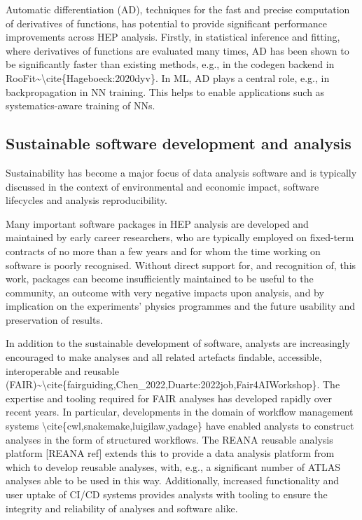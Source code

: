 Automatic differentiation (AD), techniques for the fast and precise
computation of derivatives of functions, has potential to provide
significant performance improvements across HEP analysis. Firstly, in
statistical inference and fitting, where derivatives of functions are
evaluated many times, AD has been shown to be significantly faster than
existing methods, e.g., in the codegen backend in
RooFit\textasciitilde\textbackslash cite\{Hageboeck:2020dyv\}. In ML, AD
plays a central role, e.g., in backpropagation in NN training. This
helps to enable applications such as systematics-aware training of NNs.

\subsection{Sustainable software development and
analysis}\label{sustainable-software-development-and-analysis}

Sustainability has become a major focus of data analysis software and is
typically discussed in the context of environmental and economic impact,
software lifecycles and analysis reproducibility.

Many important software packages in HEP analysis are developed and
maintained by early career researchers, who are typically employed on
fixed-term contracts of no more than a few years and for whom the time
working on software is poorly recognised. Without direct support for,
and recognition of, this work, packages can become insufficiently
maintained to be useful to the community, an outcome with very negative
impacts upon analysis, and by implication on the experiments' physics
programmes and the future usability and preservation of results.

In addition to the sustainable development of software, analysts are
increasingly encouraged to make analyses and all related artefacts
findable, accessible, interoperable and reusable
(FAIR)\textasciitilde\textbackslash cite\{fairguiding,Chen\_2022,Duarte:2022job,Fair4AIWorkshop\}.
The expertise and tooling required for FAIR analyses has developed
rapidly over recent years. In particular, developments in the domain of
workflow management systems
\textbackslash cite\{cwl,snakemake,luigilaw,yadage\} have enabled
analysts to construct analyses in the form of structured workflows. The
REANA reusable analysis platform {[}REANA ref{]} extends this to provide
a data analysis platform from which to develop reusable analyses, with,
e.g., a significant number of ATLAS analyses able to be used in this
way. Additionally, increased functionality and user uptake of CI/CD
systems provides analysts with tooling to ensure the integrity and
reliability of analyses and software alike.

